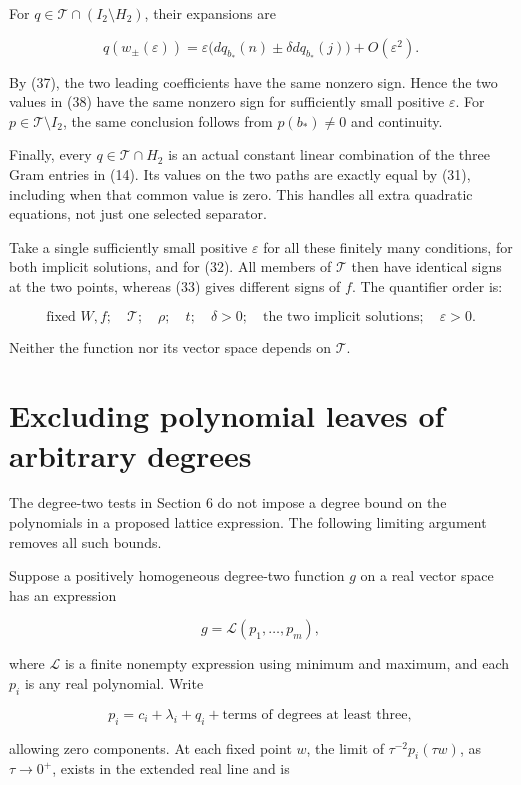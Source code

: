 \documentclass[11pt]{article}
\begin{document}
For \(q\in\mathcal T\cap(I_2\setminus H_2)\), their expansions are

\[
q(w_\pm(\varepsilon))
 =\varepsilon\bigl(dq_{b_*}(n)\pm\delta dq_{b_*}(j)\bigr)
   +O(\varepsilon^2).
\tag{38}
\]

By (37), the two leading coefficients have the same nonzero sign. Hence the
two values in (38) have the same nonzero sign for sufficiently small
positive \(\varepsilon\). For \(p\in\mathcal T\setminus I_2\), the same
conclusion follows from \(p(b_*)\ne0\) and continuity.

Finally, every \(q\in\mathcal T\cap H_2\) is an actual constant linear
combination of the three Gram entries in (14). Its values on the two paths
are exactly equal by (31), including when that common value is zero. This
handles all extra quadratic equations, not just one selected separator.

Take a single sufficiently small positive \(\varepsilon\) for all these
finitely many conditions, for both implicit solutions, and for (32). All
members of \(\mathcal T\) then have identical signs at the two points,
whereas (33) gives different signs of \(f\). The quantifier order is:

\[
\text{fixed }W,f;\quad
\mathcal T;\quad\rho;\quad t;\quad\delta>0;\quad
\text{the two implicit solutions};\quad\varepsilon>0.
\tag{39}
\]

Neither the function nor its vector space depends on \(\mathcal T\).

\section{Excluding polynomial leaves of arbitrary degrees}

The degree-two tests in Section 6 do not impose a degree bound on the
polynomials in a proposed lattice expression. The following limiting
argument removes all such bounds.

Suppose a positively homogeneous degree-two function \(g\) on a real vector
space has an expression

\[
g=\mathcal L(p_1,\ldots,p_m),
\tag{40}
\]

where \(\mathcal L\) is a finite nonempty expression using minimum and
maximum, and each \(p_i\) is any real polynomial. Write

\[
p_i=c_i+\lambda_i+q_i+\text{terms of degrees at least three},
\]

allowing zero components. At each fixed point \(w\), the limit of
\(\tau^{-2}p_i(\tau w)\), as \(\tau\to0^+\), exists in the extended real
line and is
\end{document}
